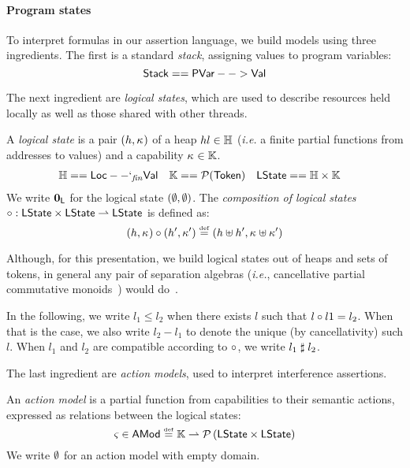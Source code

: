 \paragraph{Program states}
To interpret formulas in our assertion language, we build models using
three ingredients. The first is a standard \emph{stack}, assigning
values to program variables:
\[
\mathsf{Stack} == \mathsf{PVar} --> \mathsf{Val}
\]

The next ingredient are \emph{logical states}, which are used to
describe resources held locally as well as those shared with other
threads. 

\begin{definition}
  A \emph{logical state} is a pair $(h, \kappa_{})$ of a heap $h
  l\in\mathbb{H}$ (\textit{i.e.} a finite partial functions from addresses
  to values) and a capability $\kappa_{} \in\mathbb{K}$.
  \begin{align*}
    \mathbb{H} &== \mathsf{Loc} --`_{\mathit{fin}} \mathsf{Val}&
    \mathbb{K} &== \mathcal{P}(\mathsf{Token})&
    \textsf{LState} &== \mathbb{H}\times \mathbb{K}
  \end{align*}
  We write $\mathbf{0}_{\textsf{L}}$ for the logical state $(\emptyset, \emptyset)$. The
  \emph{composition of logical states}
  $
  \circ : \textsf{LState} \times \textsf{LState} \rightharpoonup \textsf{LState}
  $
  is defined as:
  \[
  (h,\kappa_{}) \circ (h', \kappa_{}') \mathrel{\stackrel{\smash{\scriptscriptstyle{\mathrm{def}}}}{=}}
  (h\uplus h', \kappa_{}\uplus \kappa_{}')
  \]
\end{definition}

Although, for this presentation, we build logical states out of heaps
and sets of tokens, in general any pair of separation algebras
(\textit{i.e.}, cancellative partial commutative monoids~\cite{asl})
would do~\cite{colosl-tr14}.

In the following, we write $l_1\leq l_2$ when there exists $l$ such
that $l\circ l1 = l_2$. When that is the case, we also write $l_2
- l_1$ to denote the unique (by cancellativity) such $l$. When $l_1$
and $l_2$ are compatible according to $\circ$, we write
$l_1\mathrel{\sharp} l_2$.

The last ingredient are \emph{action models}, used to interpret
interference assertions.

\begin{definition}
An \emph{action model} is a partial function from capabilities to
their semantic actions, expressed as relations between the logical
states:
\[
	\varsigma_{} \in \textsf{AMod} \mathrel{\stackrel{\smash{\scriptscriptstyle{\mathrm{def}}}}{=}} \mathbb{K} \rightharpoonup \mathcal{P}\left(\textsf{LState} \times \textsf{LState} \right)
\]
We write $\emptyset$ for an action model with empty domain.
\end{definition}


